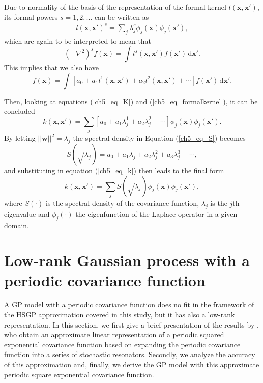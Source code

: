 \documentclass[onecolumn,a4paper,11pt]{article}
\begin{document}
Due to normality of the basis of the representation of the formal kernel $l(\bm{x},\bm{x}')$, its formal powers $s=1,2,\dots$ can be written as
%
\begin{eqnarray}\label{ch5_eq_formalkernel}
l(\bm{x},\bm{x}')^s= \sum_j \lambda_j^s \phi_j(\bm{x}) \phi_j(\bm{x}'),
\end{eqnarray} 
which are again to be interpreted to mean that
%
\begin{equation*}
(-\nabla^2)^s f(\bm{x}) = \int l^s(\bm{x},\bm{x}') f(\bm{x}') \,\mathrm{d}\bm{x}'.
\end{equation*} 
This implies that we also have
%
\begin{equation*}
[a_0+a_1(-\nabla^2)+a_2(-\nabla^2)^2+\cdots] f(\bm{x}) = \int [a_0+a_1l^1(\bm{x},\bm{x}')+a_2l^2(\bm{x},\bm{x}')+\cdots] f(\bm{x}')  \,\mathrm{d}\bm{x}'.
\end{equation*} 


Then, looking at equations (\ref{ch5_eq_K}) and (\ref{ch5_eq_formalkernel}), it can be concluded 
%
\begin{equation}\label{ch5_eq_k}
k(\bm{x},\bm{x}')= \sum_j [a_0+a_1\lambda_j^1+a_2\lambda_j^2+\cdots] \phi_j(\bm{x}) \phi_j(\bm{x}').
\end{equation} 
By letting $||\bm{w}||^2=\lambda_j$ the spectral density in Equation (\ref{ch5_eq_S}) becomes
%
\begin{equation*}
S(\sqrt{\lambda_j})=a_0+a_1\lambda_j+a_2\lambda_j^2+a_3\lambda_j^3+\cdots,
\end{equation*}
and substituting in equation (\ref{ch5_eq_k}) then leads to the final form
%
\begin{equation}\label{ch5_eq_k_2}
k(\bm{x},\bm{x}')= \sum_j S(\sqrt{\lambda_j}) \phi_j(\bm{x}) \phi_j(\bm{x}'),
\end{equation} 
where $S(\cdot)$ is the spectral density of the covariance function, $\lambda_j$ is the $j$th eigenvalue and $\phi_j(\cdot)$ the eigenfunction of the Laplace operator in a given domain.



\section{Low-rank Gaussian process with a periodic covariance function}\label{ch5_sec_periodic}

A GP model with a periodic covariance function does no fit in the framework of the HSGP approximation covered in this study, but it has also a low-rank representation. In this section, we first give a brief presentation of the results by \citet{solin2014explicit}, who obtain an approximate linear representation of a periodic squared exponential covariance function based on expanding the periodic covariance function into a series of stochastic resonators. Secondly, we analyze the accuracy of this approximation and, finally, we derive the GP model with this approximate periodic square exponential covariance function.
\end{document}
